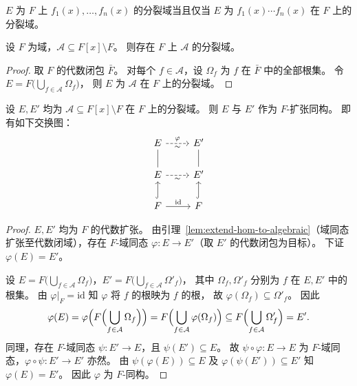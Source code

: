 \documentclass[lang=cn,a4paper,newtx]{elegantbook}
\begin{document}
\begin{remark}
  $E$ 为 $F$ 上 $f_1(x),\dots,f_n(x)$ 的分裂域当且仅当 $E$ 为 $f_1(x)\cdots f_n(x)$ 在 $F$ 上的分裂域。
\end{remark}

\begin{theorem}[分裂域的存在性]
  设 $F$ 为域，$\mathcal{A}\subseteq F[x]\setminus F$。
  则存在 $F$ 上 $\mathcal{A}$ 的分裂域。
\end{theorem}

\begin{proof}
  取 $F$ 的代数闭包 $\bar F$。
  对每个 $f\in\mathcal{A}$，设 $\Omega_f$ 为 $f$ 在 $\bar F$ 中的全部根集。
  令 $E=F\bigl(\bigcup_{f\in\mathcal{A}}\Omega_f\bigr)$，
  则 $E$ 为 $\mathcal{A}$ 在 $F$ 上的分裂域。
\end{proof}

\begin{theorem}[分裂域的唯一性]
  设 $E,E'$ 均为 $\mathcal{A}\subseteq F[x]\setminus F$ 在 $F$ 上的分裂域。
  则 $E$ 与 $E'$ 作为 $F$-扩张同构。
  即有如下交换图：
  \[
    \begin{tikzcd}
      E \arrow[r,dashed,"\varphi","\sim"'] & E' \\
      E \arrow[u,dash] \arrow[r,dashed,"\sim"'] & E' \arrow[u,dash] \\
      F \arrow[u,hook] \arrow[r,"\mathrm{id}"] & F \arrow[u,hook]
    \end{tikzcd}
  \]
\end{theorem}

\begin{proof}
  $E,E'$ 均为 $F$ 的代数扩张。
  由引理~\ref{lem:extend-hom-to-algebraic}（域同态扩张至代数闭域），存在 $F$-域同态 $\varphi\colon E\to E'$（取 $E'$ 的代数闭包为目标）。
  下证 $\varphi(E)=E'$。

  设 $E=F\bigl(\bigcup_{f\in\mathcal{A}}\Omega_f\bigr)$，$E'=F\bigl(\bigcup_{f\in\mathcal{A}}\Omega'_f\bigr)$，
  其中 $\Omega_f,\Omega'_f$ 分别为 $f$ 在 $E,E'$ 中的根集。
  由 $\varphi\big|_F=\mathrm{id}$ 知 $\varphi$ 将 $f$ 的根映为 $f$ 的根，
  故 $\varphi(\Omega_f)\subseteq\Omega'_f$。
  因此
  \[
    \varphi(E)=\varphi\Bigl(F\Bigl(\bigcup_{f\in\mathcal{A}}\Omega_f\Bigr)\Bigr)=F\Bigl(\bigcup_{f\in\mathcal{A}}\varphi(\Omega_f)\Bigr)\subseteq F\Bigl(\bigcup_{f\in\mathcal{A}}\Omega'_f\Bigr)=E'.
  \]
  同理，存在 $F$-域同态 $\psi\colon E'\to E$，且 $\psi(E')\subseteq E$。
  故 $\psi\circ\varphi\colon E\to E$ 为 $F$-域同态，$\varphi\circ\psi\colon E'\to E'$ 亦然。
  由 $\psi(\varphi(E))\subseteq E$ 及 $\varphi(\psi(E'))\subseteq E'$ 知 $\varphi(E)=E'$。
  因此 $\varphi$ 为 $F$-同构。
\end{proof}
\end{document}
